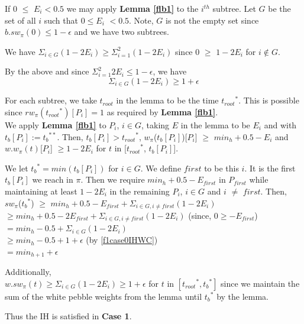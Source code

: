 \documentclass[oribib1]{llncs}
\newcommand{\troot}{t_{root}}
\newcommand{\troots}{{t_{root}}^*}
\newcommand{\tbss}{{t_b}^{**}}
\newcommand{\tbs}{{t_b}^{*}}
\newcommand{\tbith}{t_b[{P_i}]}
\begin{document}
If 0 ${\leq}$ $E_i {<} 0.5$ we may apply {\bf Lemma \ref{flb1}} to the $i^{th}$ subtree. Let $G$ be the set of all $i$ such that $0 {\leq} E_i$ ${<} 0.5$. Note, $G$ is not the empty set since $b.sw_{\pi}(0) \leq 1-\epsilon$ and we have two subtrees.

\medskip

We have $\Sigma_{i \in G} (1 - 2E_i) \geq \Sigma_{i=1}^2 (1- 2E_i)$ since 0 $\geq$ $1 - 2E_i$ for $i \notin G$. 

By the above and since $\Sigma_{i=1}^2 2E_i \leq 1-\epsilon$, we have
\begin{equation}\Sigma_{i \in G} (1 - 2E_i) \geq 1 + \epsilon \label{f1case0IHWC}\end{equation}

For each subtree, we take $\troot$ in the lemma to be the time $\troots$. This is possible since $rw_\pi(\troots)[P_i]=1$ as required by {\bf Lemma \ref{flb1}}.\\

We apply {\bf Lemma \ref{flb1}} to $P_i$, $i \in G$,  taking $E$ in the lemma to be ${E_i}$ and with $\tbith := \tbss$. Then, $\tbith >\troots$, $w_{\pi}$($\tbith$)[$P_i$] $\geq$ $min_h+0.5-E_i$ and $w.w_\pi(t)$[$P_i$] $\geq 1-2E_i$ for $t$ in [$\troots$, $\tbith$]. 

\medskip

We let $\tbs=min(\tbith)$ for $i \in G$. We define $first$ to be this $i$. It is the first $\tbith$ we reach in $\pi$. Then we require $min_h+0.5-E_{first}$ in $P_{first}$ while maintaining at least $1-2E_i$ in the remaining $P_i$, $i \in G$ and $i$ $\ne$ $first$. Then,\\
$sw_{\pi}$($\tbs$) $\geq$ $min_h+0.5-E_{first}+\Sigma_{i \in G, i \ne first} (1-2E_i)$\\
$\geq min_h+0.5-2E_{first}+\Sigma_{i \in G, i \ne first} (1-2E_i)$  (since, $0 \geq -E_{first}$)\\
$= min_h-0.5+\Sigma_{i \in G} (1-2E_i)$\\
$\geq min_h-0.5+1+\epsilon$ (by \ref{f1case0IHWC})\\
$= min_{h+1}+\epsilon$

Additionally, \\
$w.sw_\pi(t) \geq \Sigma_{i \in G} (1 - 2E_i) \geq 1 + \epsilon$ for $t$ in $[\troots, \tbs]$ since we maintain the sum of the white pebble weights from the lemma until $\tbs$ by the lemma. 

Thus the IH is satisfied in {\bf Case 1}.

\bigskip
\end{document}
